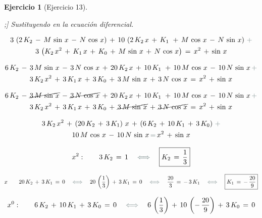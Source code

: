 \documentclass[a4paper,11pt, openany]{book}
\newtheorem{ejer}{Ejercicio}[section]
\newcommand*{\itembolasazules}[1]{%
\footnotesize\protect\tikz[baseline=-3pt]%
\protect\node[scale=.7, circle, shade, ball
color=green]{\color{white}\Large\bf#1};}
\begin{document}
\begin{ejer}[Ejercicio 13]
\begin{enumerate}[label=\itembolasazules{\arabic*}]
Sustituyendo en la ecuación diferencial.
 
\begin{multline*}
3\,\left(2\,K_{2}\,-\,M\,\sin\,x\,-\,N\,\cos\,x \right)\,+\,10\,\left(2\,K_{2}\,x\,+\,K_{1}\,\,+\,M\,\cos\,x\,-\,N\,\sin\,x \right)\,\textcolor{aurometalsaurus}{+} \\
3\,\left(K_{2}\,x^{2}\,+\,K_{1}\,x\,+\,K_{0}\,+\,M\,\sin\,x\,+\,N\,\cos\,x \right)\,=\,x^{2}\,+\,\sin\,x
\end{multline*}
 
\begin{multline*}
6\,K_{2}\,-\,3\,M\,\sin\,x\,-\,3\,N\,\cos\,x\,+\,20\,K_{2}\,x\,+\,10\,K_{1}\,\,+\,10\,M\,\cos\,x\,-\,10\,N\,\sin\,x\,\textcolor{aurometalsaurus}{+} \\
3\,K_{2}\,x^{2}\,+\,3\,K_{1}\,x\,+\,3\,K_{0}\,+\,3\,M\,\sin\,x\,+\,3\,N\,\cos\,x\,=\,x^{2}\,+\,\sin\,x
\end{multline*}
 
\begin{multline*}
6\,K_{2}\,-\,\cancel{3\,M\,\sin\,x}\,-\,\cancel{3\,N\,\cos\,x}\,+\,20\,K_{2}\,x\,+\,10\,K_{1}\,\,+\,10\,M\,\cos\,x\,-\,10\,N\,\sin\,x\,\textcolor{aurometalsaurus}{+} \\
3\,K_{2}\,x^{2}\,+\,3\,K_{1}\,x\,+\,3\,K_{0}\,+\,\cancel{3\,M\,\sin\,x}\,+\,\cancel{3\,N\,\cos\,x}\,=\,x^{2}\,+\,\sin\,x
\end{multline*}
 
\begin{multline*}
3\,K_{2}\,x^{2}\,+\,\left(20\,K_{2}\,+\,3\,K_{1} \right)\,x\,+\,\left(6\,K_{2}\,+\,10\,K_{1}\,+\,3\,K_{0} \right)\,\textcolor{aurometalsaurus}{+} \\   
10\,M\,\cos\,x\,-\,10\,N\,\sin\,x\,\textcolor{aurometalsaurus}{=}\,x^{2}\,+\,\sin\,x
\end{multline*}
 
$$x^{2}: \qquad 3\,K_{2}\,=\,1 \quad \textcolor{aurometalsaurus}{\iff} \quad \boxed{K_{2}\,=\,\dfrac{1}{3}}$$
 
$$x \qquad 20\,K_{2}\,+\,3\,K_{1}\,=\,0 \quad \textcolor{aurometalsaurus}{\iff} \quad 20\,\left(\dfrac{1}{3} \right)\,+\,3\,K_{1}\,=\,0 \quad \textcolor{aurometalsaurus}{\iff} \quad \dfrac{20}{3}\,=\,-\,3\,K_{1}\quad \textcolor{aurometalsaurus}{\iff} \quad \boxed{K_{1}\,=\,-\,\dfrac{20}{9} }$$
 
$$x^{0}: \qquad 6\,K_{2}\,+\,10\,K_{1}\,+\,3\,K_{0}\,=\,0 \quad \textcolor{aurometalsaurus}{\iff} \quad 6\,\left(\dfrac{1}{3} \right)\,+\,10\,\left(-\,\dfrac{20}{9} \right)\,+\,3\,K_{0}\,=\,0$$
 

\end{enumerate}
\end{ejer}
\end{document}
